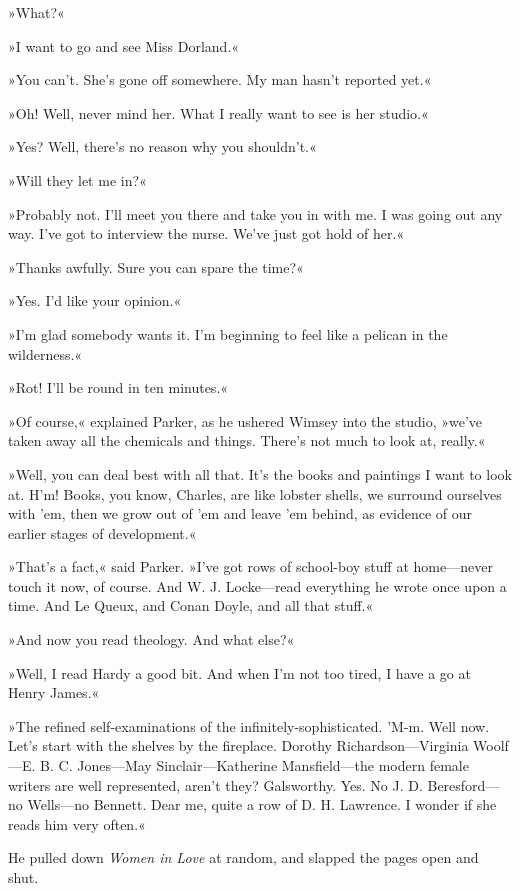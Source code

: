»What?«

»I want to go and see Miss Dorland.«

»You can't. She's gone off somewhere. My man hasn't reported yet.«

»Oh! Well, never mind her. What I really want to see is her studio.«

»Yes? Well, there's no reason why you shouldn't.«

»Will they let me in?«

»Probably not. I'll meet you there and take you in with me. I was going out any way. I've got to interview the nurse. We've just got hold of her.«

»Thanks awfully. Sure you can spare the time?«

»Yes. I'd like your opinion.«

»I'm glad somebody wants it. I'm beginning to feel like a pelican in the wilderness.«

»Rot! I'll be round in ten minutes.«

»Of course,« explained Parker, as he ushered Wimsey into the studio, »we've taken away all the chemicals and things. There's not much to look at, really.«

»Well, you can deal best with all that. It's the books and paintings I want to look at. H'm! Books, you know, Charles, are like lobster shells, we surround ourselves with 'em, then we grow out of 'em and leave 'em behind, as evidence of our earlier stages of development.«

»That's a fact,« said Parker. »I've got rows of school-boy stuff at home—never touch it now, of course. And W. J. Locke—read everything he wrote once upon a time. And Le Queux, and Conan Doyle, and all that stuff.«

»And now you read theology. And what else?«

»Well, I read Hardy a good bit. And when I'm not too tired, I have a go at Henry James.«

»The refined self-examinations of the infinitely-sophisticated. 'M-m. Well now. Let's start with the shelves by the fireplace. Dorothy Richardson—Virginia Woolf—E. B. C. Jones—May Sinclair—Katherine Mansfield—the modern female writers are well represented, aren't they? Galsworthy. Yes. No J. D. Beresford—no Wells—no Bennett. Dear me, quite a row of D. H. Lawrence. I wonder if she reads him very often.«

He pulled down \textit{Women in Love} at random, and slapped the pages open and shut.

